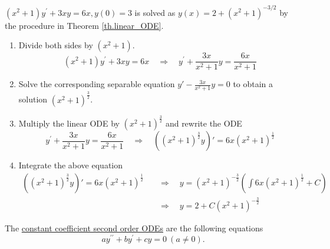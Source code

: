 \begin{example}[]
    $(x^2+1) y^{\prime}+3 x y=6 x, y(0)=3$ is solved as $y(x)=2+(x^2+1)^{-3 / 2}$ by the procedure in Theorem \ref{th.linear_ODE}.
    \begin{enumerate}
        \item Divide both sides by $(x^2+1)$.
        \begin{equation*}
            (x^2+1) y^{\prime}+3 x y=6x 
            \quad\Rightarrow\quad
            y^{\prime} + \frac{3 x}{x^2+1} y = \frac{6x}{x^2+1}
        \end{equation*}
        \item Solve the corresponding separable equation $y' - \frac{3 x}{x^2+1}y = 0$ to obtain a solution $(x^2+1)^{\frac{3}{2}}$.
        \item Multiply the linear ODE by $(x^2+1)^{\frac{3}{2}}$ and rewrite the ODE
        \begin{equation*}
            y^{\prime} + \frac{3 x}{x^2+1} y = \frac{6x}{x^2+1} 
            \quad\Rightarrow\quad
            ((x^2+1)^{\frac{3}{2}}y)' = 6x(x^2+1)^{\frac{1}{2}}
        \end{equation*}
        \item Integrate the above equation
        \begin{equation*}
            \begin{split}
                ((x^2+1)^{\frac{3}{2}}y)' = 6x(x^2+1)^{\frac{1}{2}}
                \quad&\Rightarrow\quad
                y = (x^2+1)^{-\frac{3}{2}} \left(\int 6x(x^2+1)^{\frac{1}{2}}+ C\right)
                \\
                &\Rightarrow\quad
                y = 2 + C(x^2+1)^{-\frac{3}{2}}
            \end{split} 
        \end{equation*}
    \end{enumerate}
\end{example}

\begin{definition}
    The \underline{constant coefficient second order ODEs} are the following equations
    \begin{equation}\label{eq.2nd_ODE}
        a y^{\prime \prime}+b y^{\prime}+c y=0\ (a \neq 0) .
    \end{equation}
\end{definition}

